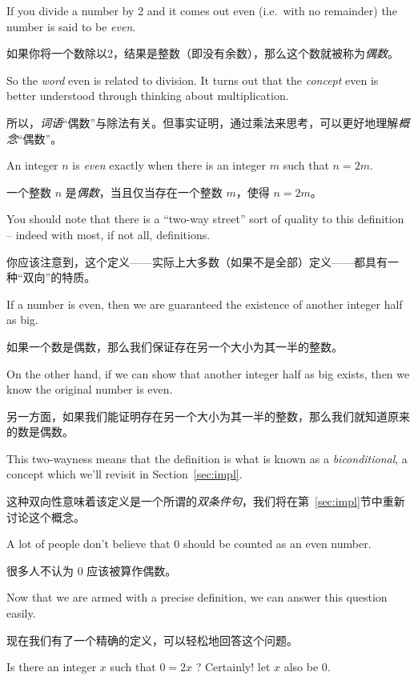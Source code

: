 If you divide a number by 2 and it comes out even (i.e.\ with
no remainder) the number is said to be {\em even}.

如果你将一个数除以2，结果是整数（即没有余数），那么这个数就被称为{\em 偶数}。

So the 
{\em word} even is related to division.  It turns out that the
{\em concept} even is better understood through thinking about
multiplication.

所以，{\em 词语}“偶数”与除法有关。但事实证明，通过乘法来思考，可以更好地理解{\em 概念}“偶数”。

\begin{defi}
An integer $n$ is {\em even} exactly when there is an integer $m$
such that $n = 2m$.
\end{defi}

\begin{defi}
一个整数 $n$ 是{\em 偶数}，当且仅当存在一个整数 $m$，使得 $n = 2m$。
\end{defi}

You should note that there is a ``two-way street'' sort of quality
to this definition -- indeed with most, if not all, definitions.

你应该注意到，这个定义——实际上大多数（如果不是全部）定义——都具有一种“双向”的特质。

If 
a number is even, then we are guaranteed the existence of another
integer half as big.

如果一个数是偶数，那么我们保证存在另一个大小为其一半的整数。

On the other hand, if we can show that another
integer half as big exists, then we know the original number is even.

另一方面，如果我们能证明存在另一个大小为其一半的整数，那么我们就知道原来的数是偶数。

This two-wayness means that the definition is what is known as a 
{\em biconditional}, a concept which we'll revisit in
Section~\ref{sec:impl}.

这种双向性意味着该定义是一个所谓的{\em 双条件句}，我们将在第~\ref{sec:impl}节中重新讨论这个概念。

A lot of people don't believe that $0$ should be counted as an even
number.

很多人不认为 $0$ 应该被算作偶数。

Now that we are armed with a precise definition, we can
answer this question easily.

现在我们有了一个精确的定义，可以轻松地回答这个问题。

Is there an integer $x$ such that
$0 = 2x$ ?  Certainly! let $x$ also be $0$.

